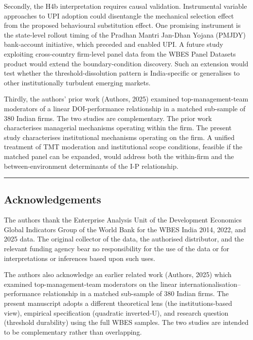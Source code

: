 \documentclass[
  12pt,a4paper]{article}
\begin{document}
Secondly, the H4b interpretation requires causal validation.
Instrumental variable approaches to UPI adoption could disentangle the
mechanical selection effect from the proposed behavioural substitution
effect. One promising instrument is the state-level rollout timing of
the Pradhan Mantri Jan-Dhan Yojana (PMJDY) bank-account initiative,
which preceded and enabled UPI. A future study exploiting cross-country
firm-level panel data from the WBES Panel Datasets product would extend
the boundary-condition discovery. Such an extension would test whether
the threshold-dissolution pattern is India-specific or generalises to
other institutionally turbulent emerging markets.

Thirdly, the authors' prior work (Authors, 2025) examined
top-management-team moderators of a linear DOI-performance relationship
in a matched sub-sample of 380 Indian firms. The two studies are
complementary. The prior work characterises managerial mechanisms
operating within the firm. The present study characterises institutional
mechanisms operating on the firm. A unified treatment of TMT moderation
and institutional scope conditions, feasible if the matched panel can be
expanded, would address both the within-firm and the between-environment
determinants of the I-P relationship.

\begin{center}\rule{0.5\linewidth}{0.5pt}\end{center}

\hypertarget{acknowledgements}{%
\subsection{Acknowledgements}\label{acknowledgements}}

The authors thank the Enterprise Analysis Unit of the Development
Economics Global Indicators Group of the World Bank for the WBES India
2014, 2022, and 2025 data. The original collector of the data, the
authorised distributor, and the relevant funding agency bear no
responsibility for the use of the data or for interpretations or
inferences based upon such uses.

The authors also acknowledge an earlier related work (Authors, 2025)
which examined top-management-team moderators on the linear
internationalisation--performance relationship in a matched sub-sample
of 380 Indian firms. The present manuscript adopts a different
theoretical lens (the institutions-based view), empirical specification
(quadratic inverted-U), and research question (threshold durability)
using the full WBES samples. The two studies are intended to be
complementary rather than overlapping.
\end{document}
